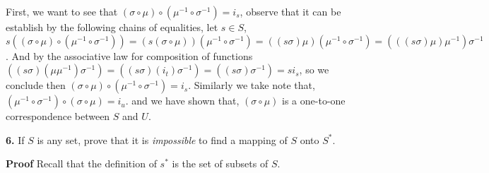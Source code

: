 \documentclass[11pt,a4paper]{article}
\begin{document}
First, we want to see that $ (\sigma \circ \mu)  \circ ( \mu^{-1} \circ \sigma^{-1} ) = i_s $, observe that it can be establish by the following chains of equalities, let $s \in S$, $ s( (\sigma \circ \mu)  \circ ( \mu^{-1} \circ \sigma^{-1} ) ) = (s (\sigma \circ \mu))( \mu^{-1} \circ \sigma^{-1} )  = ( (s \sigma)\mu)( \mu^{-1} \circ \sigma^{-1} ) = (( (s \sigma)\mu)\mu^{-1}) \sigma^{-1} $.
And by the associative law for composition of functions $  ((s \sigma)(\mu\mu^{-1}) \sigma^{-1}) = ((s \sigma)(i_t) \sigma^{-1}) = ((s \sigma)\sigma^{-1}) = si_s $, so we conclude then $ (\sigma \circ \mu)  \circ ( \mu^{-1} \circ \sigma^{-1} ) = i_s $. Similarly we take note that, $ (\mu^{-1} \circ \sigma^{-1} )  \circ ( \sigma \circ \mu  ) = i_u $. and we have shown that, $ (\sigma \circ \mu)  $ is a one-to-one correspondence between $S$ and $U$. \par 

\textbf{6.} If $S$ is any set, prove that it is \emph{impossible} to find a mapping of $S$ onto $S^*$. \par 
\textbf{Proof} 
Recall that the definition of $ s^*$ is the set of subsets of $S$.
\end{document}
